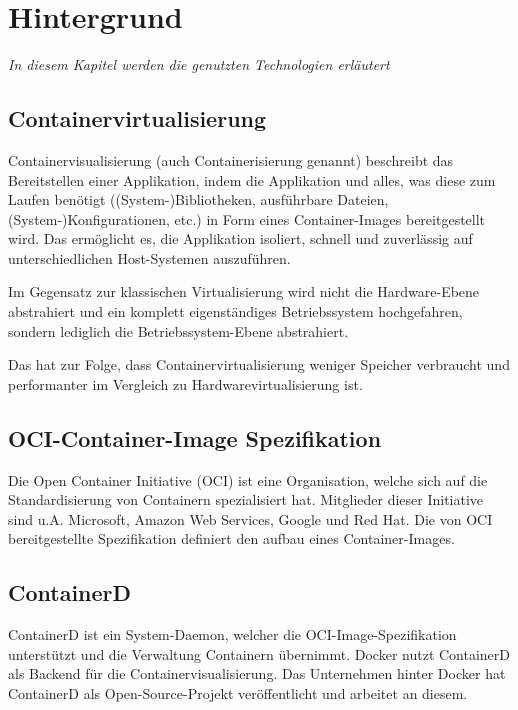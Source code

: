 \chapter{Hintergrund} \label{cha:background}

\textit{In diesem Kapitel werden die genutzten Technologien erläutert}

\section{Containervirtualisierung}

Containervisualisierung (auch Containerisierung genannt) beschreibt das Bereitstellen einer Applikation, indem die Applikation und alles, was diese zum Laufen benötigt ((System-)Bibliotheken, ausführbare Dateien, (System-)Konfigurationen, etc.) in Form eines Container-Images bereitgestellt wird. Das ermöglicht es, die Applikation isoliert, schnell und zuverlässig auf unterschiedlichen Host-Systemen auszuführen.

Im Gegensatz zur klassischen Virtualisierung wird nicht die Hardware-Ebene abstrahiert und ein komplett eigenständiges Betriebssystem hochgefahren, sondern lediglich die Betriebssystem-Ebene abstrahiert.

Das hat zur Folge, dass Containervirtualisierung weniger Speicher verbraucht und performanter im Vergleich zu Hardwarevirtualisierung ist.

\section{OCI-Container-Image Spezifikation}

Die Open Container Initiative (OCI) ist eine Organisation, welche sich auf die Standardisierung von Containern spezialisiert hat. Mitglieder dieser Initiative sind u.A. Microsoft, Amazon Web Services, Google und Red Hat. Die von OCI bereitgestellte Spezifikation definiert den aufbau eines Container-Images.

\section{ContainerD}

ContainerD ist ein System-Daemon, welcher die OCI-Image-Spezifikation unterstützt und die Verwaltung Containern übernimmt. Docker nutzt ContainerD als Backend für die Containervisualisierung. Das Unternehmen hinter Docker hat ContainerD als Open-Source-Projekt veröffentlicht und arbeitet an diesem.

